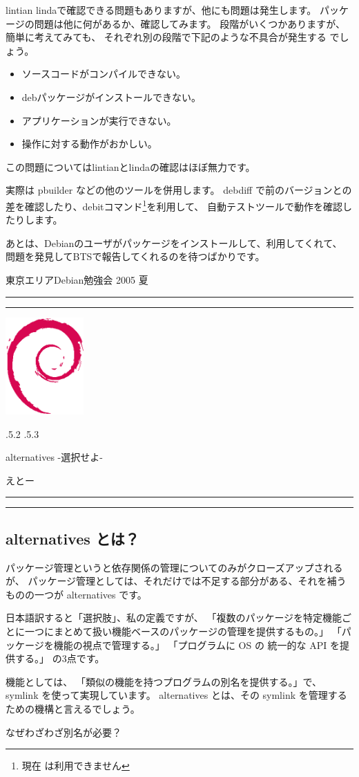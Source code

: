 \documentclass[mingoth,a4paper]{jsarticle}
\makeatletter
\renewcommand{\section}{\@startsection{section}{1}{\z@}%
    {\Cvs \@plus.5\Cdp \@minus.2\Cdp}%
    {.5\Cvs \@plus.3\Cdp}%
    {\normalfont\Large\headfont\raggedright\centering}} %
\newcommand{\dancersection}[2]{%
\newpage
東京エリアDebian勉強会 2005 夏
\hrule
\vspace{0.5mm}
\hrule
\hfill{}\includegraphics[width=3cm]{image200502/openlogo-nd.eps}\\
\vspace{-4cm}
\begin{center}
  \section{#1}
\end{center}
\hfill{}#2\hspace{3cm}\space\\
\hrule
\hrule
\vspace{1cm}
}
\makeatother
\begin{document}
lintian lindaで確認できる問題もありますが、他にも問題は発生します。
パッケージの問題は他に何があるか、確認してみます。
段階がいくつかありますが、簡単に考えてみても、
それぞれ別の段階で下記のような不具合が発生する
でしょう。

\begin{itemize}
 \item ソースコードがコンパイルできない。
 \item debパッケージがインストールできない。
 \item アプリケーションが実行できない。
 \item 操作に対する動作がおかしい。
\end{itemize}

この問題についてはlintianとlindaの確認はほぼ無力です。

実際は pbuilder などの他のツールを併用します。
debdiff で前のバージョンとの差を確認したり、debitコマンド\footnote{現在
は利用できません}を利用して、
自動テストツールで動作を確認したりします。

あとは、Debianのユーザがパッケージをインストールして、利用してくれて、
問題を発見してBTSで報告してくれるのを待つばかりです。



\dancersection{alternatives -選択せよ-}{えとー}
\subsection{alternatives とは？}
     パッケージ管理というと依存関係の管理についてのみがクローズアップされるが、
   パッケージ管理としては、それだけでは不足する部分がある、それを補うものの一つが
   alternatives です。
  
     日本語訳すると「選択肢」、私の定義ですが、
   「複数のパッケージを特定機能ごとに一つにまとめて扱い機能ベースのパッケージの管理を提供するもの。」
   「パッケージを機能の視点で管理する。」
   「プログラムに OS の 統一的な API を提供する。」
    の3点です。

   機能としては、
     「類似の機能を持つプログラムの別名を提供する。」で、symlink を使って実現しています。
    alternatives とは、その symlink を管理するための機構と言えるでしょう。
 
   なぜわざわざ別名が必要？
\end{document}
